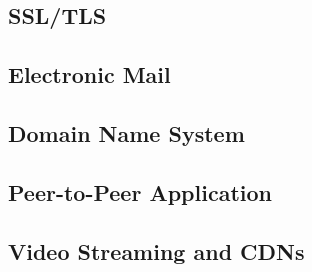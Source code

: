 \subsection{SSL/TLS}
\subsection{Electronic Mail}
\subsection{Domain Name System}
\subsection{Peer-to-Peer Application}
\subsection{Video Streaming and CDNs}
 